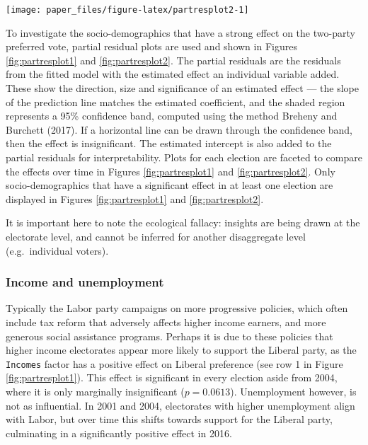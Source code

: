 \documentclass[times, doublespace]{anzsauth}
\let\origfigure\figure
\let\endorigfigure\endfigure
\renewenvironment{figure}[1][2] {
    \expandafter\origfigure\expandafter[htbp]
} {
    \endorigfigure
}
\begin{document}
\begin{figure}[h]

{\centering \texttt{[image: paper\_files/figure-latex/partresplot2-1]} 

}

\caption{Partial residual plots by election year for a selection of predictors. Linear model with 95\% confidence bands overlaid. Several predictors have a negative relationship: with larger values indicating the electorate more likely preferences Labor. Most relationships are relatively stable over elections, except OtherLanguage and Education.}\label{fig:partresplot2}
\end{figure}

To investigate the socio-demographics that have a strong effect on the two-party preferred vote, partial residual plots are used and shown in Figures \ref{fig:partresplot1} and \ref{fig:partresplot2}. The partial residuals are the residuals from the fitted model with the estimated effect an individual variable added. These show the direction, size and significance of an estimated effect --- the slope of the prediction line matches the estimated coefficient, and the shaded region represents a 95\% confidence band, computed using the method Breheny and Burchett (2017). If a horizontal line can be drawn through the confidence band, then the effect is insignificant. The estimated intercept is also added to the partial residuals for interpretability. Plots for each election are faceted to compare the effects over time in Figures \ref{fig:partresplot1} and \ref{fig:partresplot2}. Only socio-demographics that have a significant effect in at least one election are displayed in Figures \ref{fig:partresplot1} and \ref{fig:partresplot2}.

It is important here to note the ecological fallacy: insights are being drawn at the electorate level, and cannot be inferred for another disaggregate level (e.g.~individual voters).

\hypertarget{income-and-unemployment}{%
\subsubsection{Income and unemployment}\label{income-and-unemployment}}

Typically the Labor party campaigns on more progressive policies, which often include tax reform that adversely affects higher income earners, and more generous social assistance programs. Perhaps it is due to these policies that higher income electorates appear more likely to support the Liberal party, as the \texttt{Incomes} factor has a positive effect on Liberal preference (see row 1 in Figure \ref{fig:partresplot1}). This effect is significant in every election aside from 2004, where it is only marginally insignificant (\(p = 0.0613\)). Unemployment however, is not as influential. In 2001 and 2004, electorates with higher unemployment align with Labor, but over time this shifts towards support for the Liberal party, culminating in a significantly positive effect in 2016.
\end{document}
